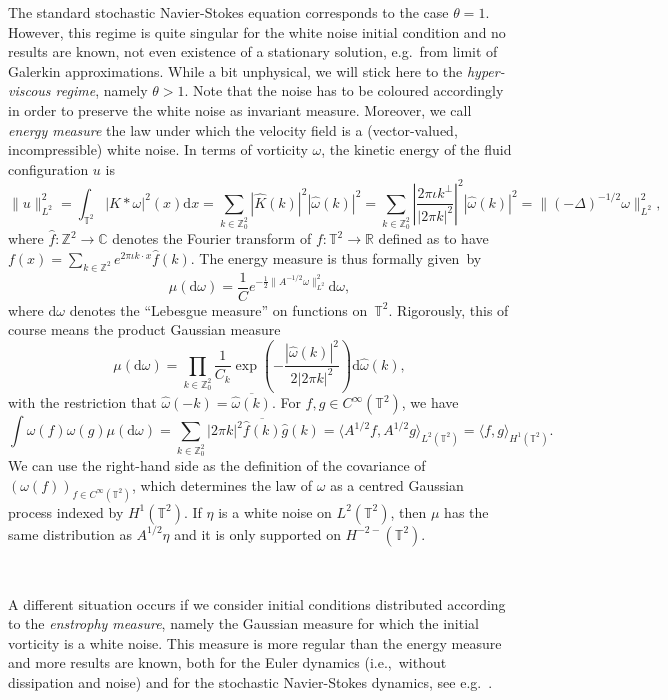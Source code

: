\documentclass{article}
\newcommand{\mathd}{\mathrm{d}}
\newcommand{\tmtextit}[1]{{\itshape{#1}}}
\begin{document}
The standard stochastic Navier-Stokes equation corresponds to the case
$\theta = 1$. However, this regime is quite singular for the white noise
initial condition and no results are known, not even existence of a stationary
solution, e.g.~from limit of Galerkin approximations. While a bit unphysical,
we will stick here to the \tmtextit{hyper-viscous regime}, namely $\theta >
1$. Note that the noise has to be coloured accordingly in order to preserve
the white noise as invariant measure. Moreover, we call \tmtextit{energy
measure} the law under which the velocity field is a (vector-valued,
incompressible) white noise. In terms of vorticity $\omega$, the kinetic
energy of the fluid configuration $u$ is
\[ \| u \|_{L^2}^2 = \int_{\mathbb{T}^2} | K \ast \omega |^2 (x) \mathd x =
   \sum_{k \in \mathbb{Z}_0^2} | \hat{K} (k) |^2 | \hat{\omega} (k) |^2 =
   \sum_{k \in \mathbb{Z}_0^2} \left| \frac{2 \pi \iota k^{\perp}}{| 2 \pi k
   |^2} \right|^2 | \hat{\omega} (k) |^2 = \| (- \Delta)^{- 1 / 2} \omega
   \|_{L^2}^2, \]
where $\hat{f} : \mathbb{Z}^2 \rightarrow \mathbb{C}$ denotes the Fourier
transform of $f : \mathbb{T}^2 \rightarrow \mathbb{R}$ defined as to have $f
(x) = \sum_{k \in \mathbb{Z}^2} e^{2 \pi \iota k \cdot x} \hat{f} (k)$. The
energy measure is thus formally given~by
\[ \mu (\mathd \omega) = \frac{1}{C} e^{- \frac{1}{2}  \| A^{- 1 / 2} \omega
   \|^2_{L^2}} \mathd \omega, \]
where $\mathd \omega$ denotes the ``Lebesgue measure'' on functions
on~$\mathbb{T}^2$. Rigorously, this of course means the product Gaussian
measure
\[ \mu (\mathd \omega) = \prod_{k \in \mathbb{Z}_0^2} \frac{1}{C_k} \exp
   \left( - \frac{| \hat{\omega} (k) |^2}{2 | 2 \pi k |^2} \right) \mathd
   \hat{\omega} (k), \]
with the restriction that $\hat{\omega} (- k) = \overline{\hat{\omega} (k)}$.
For $f, g \in C^{\infty} (\mathbb{T}^2)$, we have
\[ \int \omega (f) \omega (g) \mu (\mathd \omega) = \sum_{k \in
   \mathbb{Z}_0^2} | 2 \pi k |^2  \overline{\hat{f} (k)}  \hat{g} (k) =
   \langle A^{1 / 2} f, A^{1 / 2} g \rangle_{L^2 (\mathbb{T}^2)} = \langle f,
   g \rangle_{H^1 (\mathbb{T}^2)} . \]
We can use the right-hand side as the definition of the covariance of $(\omega
(f))_{f \in C^{\infty} (\mathbb{T}^2)}$, which determines the law of $\omega$
as a centred Gaussian process indexed by $H^1 (\mathbb{T}^2)$. If $\eta$ is a
white noise on $L^2 (\mathbb{T}^2)$, then $\mu$ has the same distribution as
$A^{1 / 2} \eta$ and it is only supported on $H^{- 2 -} (\mathbb{T}^2)$.

\

A different situation occurs if we consider initial conditions distributed
according to the \tmtextit{enstrophy measure}, namely the Gaussian measure for
which the initial vorticity is a white noise. This measure is more regular
than the energy measure and more results are known, both for the Euler
dynamics (i.e.,~without dissipation and noise) and for the stochastic
Navier-Stokes dynamics, see
e.g.~{\cite{albeverio1990global,albeverio2004uniqueness,albeverio2008some}}.
\end{document}

